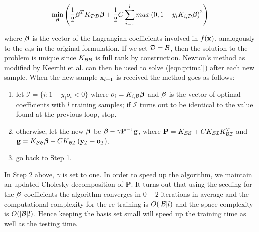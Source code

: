 \begin{equation} \label{eqn:primal}
  \min_{\boldsymbol{\beta}} \left( 
      \frac{1}{2} \boldsymbol{\beta}^T K_{\mathcal{D}\mathcal{D}} \boldsymbol{\beta}
    + \frac{1}{2} C \sum_{i=1}^l max \left(0,1-y_i K_{i,\mathcal{D}} \boldsymbol{\beta} \right)^2
  \right)
\end{equation}

\noindent where $\boldsymbol{\beta}$ is the vector of the Lagrangian coefficients involved
in $f(\mathbf{x})$, analogously to the $\alpha_i$s in the original
formulation. If we set $\mathcal{D} = \mathcal{B}$, then the solution to the problem is
unique since $K_{\mathcal{B}\mathcal{B}}$ is full rank by construction. Newton's method
as modified by Keerthi et al. \cite{KeerthiDC05,KeerthiCDC06} can then
be used to solve (\ref{eqn:primal}) after each new sample. When the new sample
$\mathbf{x}_{l+1}$ is received the method goes as follows:

\begin{enumerate}

   \item let $\mathcal{I} = \{ i: 1-y_i o_i<0 \}$ where $o_i =
     K_{i,\mathcal{B}} \boldsymbol{\beta}$ and $\boldsymbol{\beta}$ is the vector of optimal coefficients with $l$ training
	 samples; if $\mathcal{I}$ turns out to be identical to the value found
	 at the previous loop, stop. 

   \item otherwise, let the new $\boldsymbol{\beta}$ be
     $\boldsymbol{\beta} - \gamma \mathbf{P}^{-1}\mathbf{g}$, where
     $\mathbf{P} = K_{\mathcal{B}\mathcal{B}} + C K_{\mathcal{B}\mathcal{I}} K_{\mathcal{B}\mathcal{I}}^T$ and
     $\mathbf{g} = K_{\mathcal{B}\mathcal{B}} \boldsymbol{\beta} - C K_{\mathcal{B}\mathcal{I}}
        \left( \mathbf{y}_{\mathcal{I}}-\mathbf{o}_{\mathcal{I}}\right)$.

   \item go back to Step 1.

\end{enumerate}

In Step $2$ above, $\gamma$ is set to one. In order to speed up the
algorithm, we maintain an updated Cholesky decomposition of
$\mathbf{P}$.
It turns out that using the seeding for the $\boldsymbol{\beta}$ coefficients the
algorithm converges in $0-2$ iterations in average and the computational
complexity for the re-training is $O(|\mathcal{B}|l)$ and the space complexity
is $O(|\mathcal{B}|l)$. Hence keeping the basis set small will speed up the training
time as well as the testing time.
